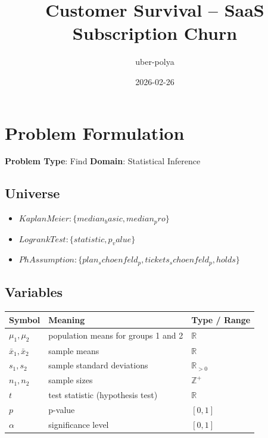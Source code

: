 \documentclass[11pt, a4paper]{article}
\title{Customer Survival -- SaaS Subscription Churn}
\author{uber-polya}
\date{2026-02-26}
\begin{document}
\maketitle
\tableofcontents
\newpage

\section{Problem Formulation}

\begin{polyamodel}

\textbf{Problem Type}: Find \hfill
\textbf{Domain}: Statistical Inference


\end{polyamodel}

\subsection{Universe}

\begin{itemize}
  \item $Kaplan Meier: \{median_basic, median_pro\}$
  \item $Logrank Test: \{statistic, p_value\}$
  \item $Ph Assumption: \{plan_schoenfeld_p, tickets_schoenfeld_p, holds\}$
\end{itemize}

\subsection{Variables}

\begin{longtable}{lll}
\toprule
\textbf{Symbol} & \textbf{Meaning} & \textbf{Type / Range} \\
\midrule
\endhead
$\mu_1, \mu_2$ & population means for groups 1 and 2 & $\mathbb{{R}}$ \\
$\bar{{x}}_1, \bar{{x}}_2$ & sample means & $\mathbb{{R}}$ \\
$s_1, s_2$ & sample standard deviations & $\mathbb{{R}}_{{>0}}$ \\
$n_1, n_2$ & sample sizes & $\mathbb{{Z}}^+$ \\
$t$ & test statistic (hypothesis test) & $\mathbb{{R}}$ \\
$p$ & p-value & $[0, 1]$ \\
$\alpha$ & significance level & $[0, 1]$ \\
\bottomrule
\end{longtable}
\end{document}
